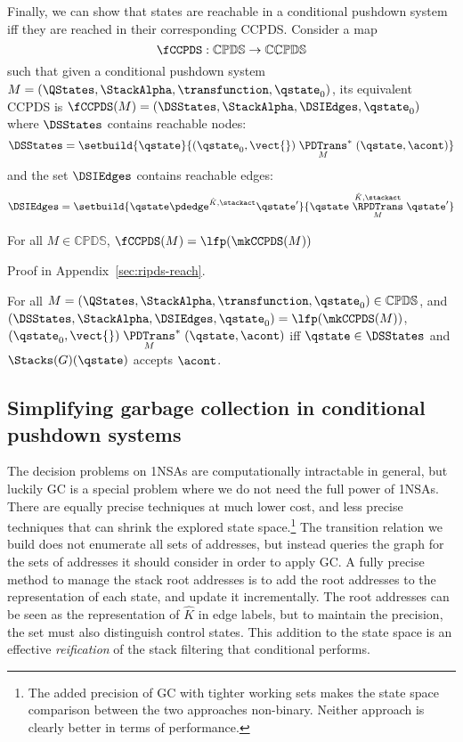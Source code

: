 Finally, we can show that states are reachable in a conditional pushdown system iff they are reached in their corresponding CCPDS.
Consider a map
\begin{equation*}
  \fCCPDS : \mathbb{CPDS} \to \mathbb{CCPDS}
\end{equation*}
such that given a conditional pushdown system $M = (\QStates, \StackAlpha, \transfunction, \qstate_0)$, its equivalent CCPDS is $\fCCPDS(M) = (\DSStates, \StackAlpha, \DSIEdges, \qstate_0)$ where $\DSStates$ contains reachable nodes:
\begin{equation*}
  \DSStates = \setbuild{\qstate}{(\qstate_0,\vect{}) \mathrel{\underset{M}{\PDTrans}^*} (\qstate,\acont)}
\end{equation*}
and the set $\DSIEdges$ contains reachable edges:
\begin{equation*}
  \DSIEdges = \setbuild{\qstate \pdedge^{\hat K, \stackact} \qstate'}{\qstate \mathrel{\overset{\hat K, \stackact}{\underset{M}{\RPDTrans}}} \qstate'}
\end{equation*}
\begin{theorem}\label{thm:ripds-to-icrpds}
  For all $M \in \mathbb{CPDS}$, $\fCCPDS(M) = \lfp(\mkCCPDS(M))$
\end{theorem}
Proof in Appendix~\ref{sec:ripds-reach}.

\begin{corollary}
  For all $M = (\QStates, \StackAlpha, \transfunction, \qstate_0) \in \mathbb{CPDS}$,
  and $(\DSStates, \StackAlpha, \DSIEdges, \qstate_0) = \lfp(\mkCCPDS(M))$,
  $(\qstate_0,\vect{}) \mathrel{{\underset{M}{\PDTrans}}^*} (\qstate,\acont)$
  iff $\qstate \in \DSStates$ and $\Stacks(G)(\qstate)$ accepts $\acont$.
\end{corollary}

\subsection{Simplifying garbage collection in conditional pushdown systems}\label{sec:gc-pdcfa}

The decision problems on 1NSAs are computationally intractable in general, but luckily GC is a special problem where we do not need the full power of 1NSAs.
There are equally precise techniques at much lower cost,
and less precise techniques that can shrink the explored state space.\footnote{The added precision of GC with tighter working sets makes the state space comparison between the two approaches non-binary. Neither approach is clearly better in terms of performance.}
The transition relation we build does not enumerate all sets of addresses, but instead queries the graph for the sets of addresses it should consider in order to apply GC.
A fully precise method to manage the stack root addresses is to add the root addresses to the representation of each state, and update it incrementally.
The root addresses can be seen as the representation of $\hat K$ in edge labels, but to maintain the precision, the set must also distinguish control states.
This addition to the state space is an effective \emph{reification} of the stack filtering that conditional performs.


